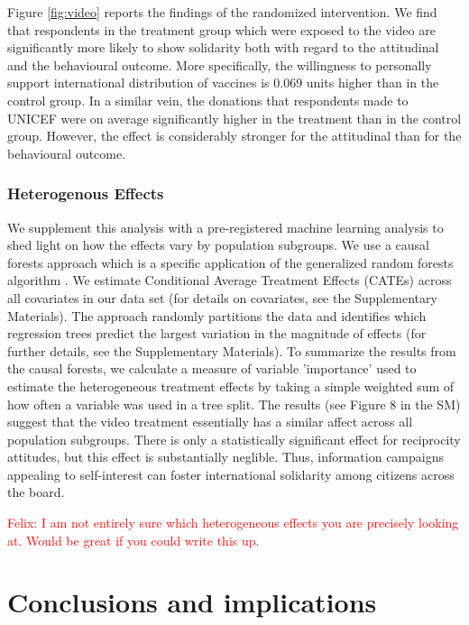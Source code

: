 \documentclass[12pt,oneside,smallheadings,chapterprefix=true]{article}
\begin{document}
Figure \ref{fig:video} reports the findings of the randomized intervention. We find that respondents in the treatment group which were exposed to the video are significantly more likely to show solidarity both with regard to the attitudinal and the behavioural outcome. More specifically, the willingness to personally support international distribution of vaccines is 0.069 units higher than in the control group. In a similar vein, the donations that respondents made to UNICEF were on average significantly higher in the treatment than in the control group. However, the effect is considerably stronger for the attitudinal than for the behavioural outcome. 


\subsubsection*{Heterogenous Effects} 
We supplement this analysis with a pre-registered machine learning analysis to shed light on how the effects vary by population subgroups.  We use a causal forests approach \citep{wager2018estimation} which is a specific application of the generalized random forests algorithm \citep{athey2019generalized}. We estimate Conditional Average Treatment Effects (CATEs) across all covariates in our data set (for details on covariates, see the Supplementary Materials). The approach randomly partitions the data and identifies which regression trees predict the largest variation in the magnitude of effects (for further details, see the Supplementary Materials). To summarize the results from the causal forests, we calculate a measure of variable 'importance' used to estimate the heterogeneous treatment effects by taking a simple weighted sum of how often a variable was used in a tree split. The results (see Figure 8 in the SM) suggest that the video treatment essentially has a similar affect across all population subgroups. There is only a statistically significant effect for reciprocity attitudes, but this effect is substantially neglible. Thus, information campaigns appealing to self-interest can foster international solidarity among citizens across the board. 


\textcolor{red}{Felix: I am not entirely sure which heterogeneous effects you are precisely looking at. Would be great if you could write this up.} 



\section{Conclusions and implications}
\end{document}
